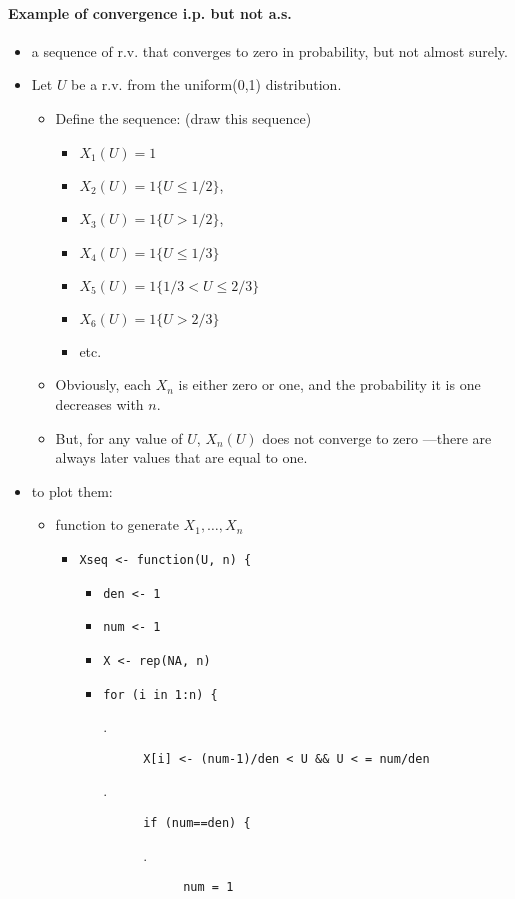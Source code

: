 \paragraph{Example of convergence i.p. but not a.s.}
\begin{itemize}
\item a sequence of r.v. that converges to zero in probability, but
        not almost surely.
\item Let $U$ be a r.v. from the uniform(0,1) distribution.
\begin{itemize}
\item Define the sequence: (draw this sequence)
\begin{itemize}
\item $X_1(U) = 1$
\item $X_2(U) = 1\{U \leq 1/2\}$,
\item $X_3(U) = 1\{U > 1/2\}$,
\item $X_4(U) = 1\{U \leq 1/3\}$
\item $X_5(U) = 1\{1/3 < U \leq 2/3\}$
\item $X_6(U) = 1\{U > 2/3\}$
\item etc.
\end{itemize}
\item Obviously, each $X_n$ is either zero or one, and the
          probability it is one decreases with $n$.
\item But, for any value of $U$, $X_n(U)$ does not converge to zero
          ---there are always later values that are equal to one.
\end{itemize}
\item to plot them:
\begin{itemize}
\item function to generate $X_1,\dots,X_n$
\begin{itemize}
\item \texttt{Xseq <- function(U, n) \{}
\begin{itemize}
\item \texttt{den <- 1}
\item \texttt{num <- 1}
\item \texttt{X <- rep(NA, n)}
\item \texttt{for (i in 1:n) \{}
  \begin{description}
  \item[.] \texttt{X[i] <- (num-1)/den < U \&\& U < = num/den}
  \item[.] \texttt{if (num==den) \{}
    \begin{description}
    \item[.] \texttt{num = 1}

\end{description}
\end{description}
\end{itemize}
\end{itemize}
\end{itemize}
\end{itemize}
